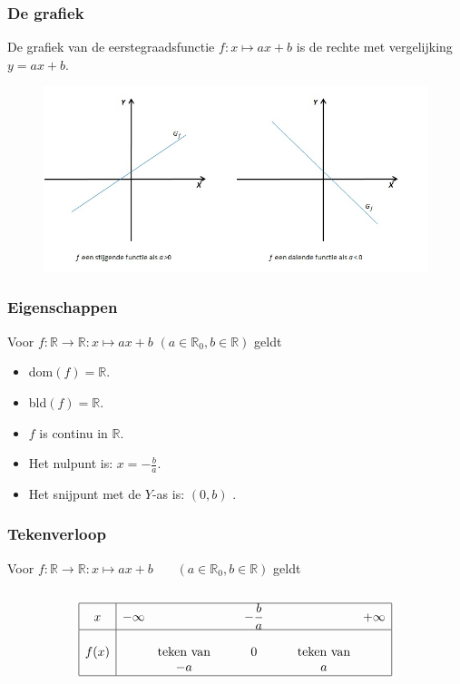 \begin{frame}
\frametitle{ De grafiek}
De grafiek van de eerstegraadsfunctie $f:x\mapsto ax+b$ is de rechte met  vergelij\-king $y=ax+b$.
\begin{figure}[htb]
\begin{center}
\includegraphics[width=5in]{figuren/rechte.jpg}
\end{center}
\end{figure}

\end{frame}

\begin{frame}
\frametitle{Eigenschappen}
\pause
\begin{eigenschap}
Voor $f:\mathbb{R}\rightarrow \mathbb{R}:x\mapsto ax+b$ $(a \in \mathbb{R}_0, b\in \mathbb{R})$ geldt
\begin{itemize}
\item dom$(f)=\mathbb{R}$.
\item bld$(f)=\mathbb{R}$.
\item $f$ is continu in $\mathbb{R}$.
\item Het nulpunt is:
      $x={\displaystyle -\frac{b}{a}}$.
\item Het snijpunt met de $Y$-as is:
      $(0,b)$ .
\end{itemize}
\end{eigenschap}
\end{frame}

\begin{frame}
\frametitle{Tekenverloop}
\pause
Voor $f:\mathbb{R}\rightarrow \mathbb{R}:x\mapsto ax+b$ ~~~$(a \in \mathbb{R}_0, b\in \mathbb{R})$ geldt
\\~\\
\[\begin{array}{|c|ccccc|}
  \hline
  x &-\infty& &~~~~~\displaystyle -\frac{b}{a}~~~~~ & &+\infty\\
  \hline
      & &                & &                &\\  
  f(x)& &\mbox{teken van}&0&\mbox{teken van}&\\
      & & -a             & & a &\\
  \hline
  \end{array}\]
\end{frame}

